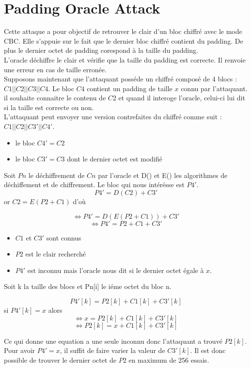
\chapter{Padding Oracle Attack}
\label{chapter:POA}

Cette attaque a pour objectif de retrouver le clair d'un bloc chiffré 
avec le mode CBC. Elle s'appuie sur le fait que le dernier bloc chiffré
contient du padding. De plus le dernier octet de padding corespond à la
taille du padding.\\

L'oracle  déchiffre le clair et vérifie que la taille du padding est correcte. 
Il renvoie une erreur en cas de taille erronée.\\

Supposons maintenant que l'attaquant posséde un chiffré composé de 4 blocs :
$C1||C2||C3||C4$. Le bloc $C4$ contient un padding de taille $x$ connu par l'attaquant.
il souhaite connaitre le contenu de $C2$ et quand il interoge l'oracle, celui-ci lui dit
si la taille est correcte ou non.\\
L'attaquant peut envoyer une version contrefaites du chiffré comme suit :
$C1||C2||C3'||C4'$.\\
\begin{itemize}
\item le bloc $C4'=C2$
\item le bloc $C3'= C3$ dont le dernier octet est modifié
\end{itemize}
Soit $Pn$ le déchiffrement de $Cn$ par l'oracle et D() et E() les algorithmes
de déchiffement et de chiffrement. 
Le bloc qui nous intérésse est $P4'$.
\[P4' = D(C2) + C3'\]
or $C2 = E(P2 + C1)$ d'où

\[\Longleftrightarrow P4' = D(E(P2 + C1)) + C3'\]
\[\Longleftrightarrow P4' = P2 + C1 + C3'\]
\begin{itemize}
\item $C1$ et $C3'$ sont connus
\item $P2$ est le clair recherché
\item $P4'$ est inconnu mais l'oracle nous dit si le dernier octet égale à $x$.
\end{itemize}
Soit k la taille des blocs et Pn[i] le iéme octet du bloc n.

\[P4'[k] = P2[k] + C1[k] + C3'[k]\] si $P4'[k] = x$ alors
\[\Longleftrightarrow x = P2[k] + C1[k] + C3'[k]\]
\[\Longleftrightarrow P2[k] = x + C1[k] + C3'[k]\]

Ce qui donne une equation a une seule inconnu donc l'attaquant a trouvé $P2[k]$.
Pour avoir $P4' = x$, il suffit de faire varier la valeur de $C3'[k]$. Il est donc
possible de trouver le dernier octet de $P2$ en maximum de 256 essais.\\

